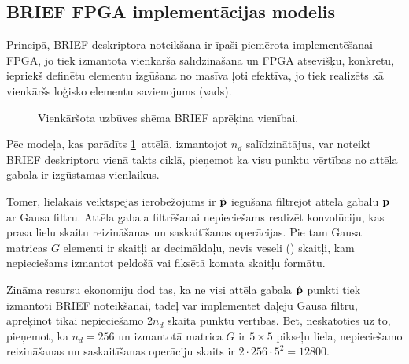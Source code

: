\subsection{BRIEF FPGA implementācijas modelis} \label{sec:brief-fpga}
Principā,
BRIEF deskriptora noteikšana ir īpaši piemērota implementēšanai FPGA, jo
tiek izmantota vienkārša salīdzināšana un 
FPGA atsevišķu, konkrētu, iepriekš definētu elementu izgūšana
no masīva ļoti efektīva, jo tiek realizēts kā vienkāršs loģisko elementu 
savienojums (vads).
\begin{figure}[tbh]
	\centering
	\def\svgscale{1.1}
	{\small}
	\caption{Vienkāršota uzbūves shēma BRIEF aprēķina vienībai.}
	\label{fig:brief-fpga}
\end{figure}
Pēc modeļa, kas parādīts \ref{fig:brief-fpga}~attēlā,
izmantojot $n_d$ salīdzinātājus, var noteikt BRIEF deskriptoru
vienā takts ciklā, pieņemot ka visu punktu vērtības no attēla gabala ir 
izgūstamas vienlaikus.

Tomēr, lielākais veiktspējas ierobežojums ir $\hat{\mathbf{p}}$ iegūšana
filtrējot attēla gabalu $\mathbf{p}$ ar Gausa filtru. Attēla gabala filtrēšanai
nepieciešams realizēt konvolūciju, kas prasa lielu skaitu reizināšanas un
saskaitīšanas operācijas. Pie tam Gausa matricas $G$ elementi ir skaitļi
ar decimāldaļu, nevis veseli () skaitļi, kam nepieciešams
izmantot peldošā vai fiksētā komata skaitļu formātu.

Zināma resursu ekonomiju dod tas, ka ne visi attēla gabala $\hat{\mathbf{p}}$
punkti tiek izmantoti BRIEF noteikšanai, tādēļ var implementēt daļēju Gausa
filtru, aprēķinot tikai nepieciešamo $2n_d$ skaita punktu vērtības.
Bet, neskatoties uz to,
pieņemot, ka $n_d = 256$ un izmantotā matrica $G$ ir $5 \times 5$ pikseļu
liela, nepieciešamo reizināšanas un saskaitīšanas operāciju skaits ir
$2\cdot 256 \cdot 5^2 = 12800$.
